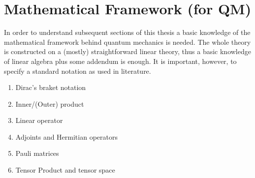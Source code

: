 

\section{Mathematical Framework (for QM)}
	
		In order to understand subsequent sections of this thesis %
		a basic knowledge of the mathematical framework behind quantum mechanics is needed. The whole theory is constructed on a (mostly) straightforward linear theory, thus a basic knowledge of linear algebra plus some addendum is enough. It is important, however, to specify a standard notation as used in literature.
	
	\begin{enumerate}
	\item Dirac's braket notation
	\item Inner/(Outer) product
	\item Linear operator
	\item Adjoints and Hermitian operators
	\item Pauli matrices
	\item Tensor Product and tensor space
	\end{enumerate}
	
